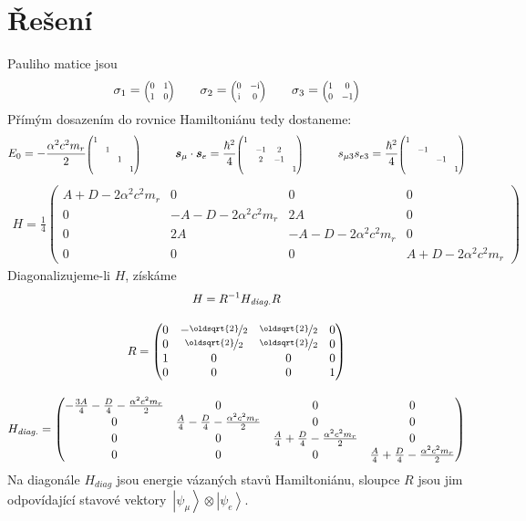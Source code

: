 \documentclass[10pt,a4paper]{article}
\newcommand{\const}[1]{\text{#1}}
\newcommand{\mat}[1]{
    \begin{pmatrix}
        #1
    \end{pmatrix}
}
\newcommand{\smat}[2][1]{
    \scalebox{#1}{$\mat{#2}$}
}
\newcommand{\ket}[1]{\left| #1 \right>}
\renewcommand{\i}{\const{i}}
\begin{document}
\section{Řešení}
Pauliho matice jsou
\begin{align*}
    \sigma_1 = \smat[0.7]{0 & 1\\1 & 0}
    \hspace{2em}
    \sigma_2 = \smat[0.7]{0 & - \i\\\i & 0}
    \hspace{2em}
    \sigma_3 = \smat[0.7]{1 & 0\\0 & -1}
\end{align*}
Přímým dosazením do rovnice Hamiltoniánu tedy dostaneme:
\begin{align*}
    E_0 =
    - \frac{\alpha^{2} c^{2} m_{r}}{2}
    \smat[0.7]{1 \\ & 1 \\ & & 1 \\ & & & 1}
    \hspace{3em}
    \bm{s}_\mu \cdot \bm{s}_e =
    \frac{\hbar^2}{4}
    \smat[0.7]{1 & & & \\ & -1 & 2 & \\ & 2 & -1 & \\ & & & 1}
    \hspace{3em}
    s_{\mu 3} s_{e 3} =
    \frac{\hbar^2}{4}
    \smat[0.7]{1 & & & \\ & -1 &  & \\ &  & -1 & \\ &  &  & 1}
\end{align*}
\begin{align*}
    H = \frac{1}{4}
    \mat{A + D - 2 \alpha^{2} c^{2} m_{r} & 0 & 0 & 0\\0 & - A - D - 2 \alpha^{2} c^{2} m_{r} & 2 A & 0\\0 & 2 A & - A - D - 2 \alpha^{2} c^{2} m_{r} & 0\\0 & 0 & 0 & A + D - 2 \alpha^{2} c^{2} m_{r}}
\end{align*}
Diagonalizujeme-li $H$, získáme
\begin{gather*}
    H = R^{-1} H_\textit{diag.} R
    \\[10pt]
    R = \mat{0 & - \nicefrac{\oldsqrt{2}}{2} & \nicefrac{\oldsqrt{2}}{2} & 0\\0 & \nicefrac{\oldsqrt{2}}{2} & \nicefrac{\oldsqrt{2}}{2} & 0\\1 & 0 & 0 & 0\\0 & 0 & 0 & 1}
    \\[10pt]
    H_\textit{diag.} = \mat{- \frac{3 A}{4} - \frac{D}{4} - \frac{\alpha^{2} c^{2} m_{r}}{2} & 0 & 0 & 0\\0 & \frac{A}{4} - \frac{D}{4} - \frac{\alpha^{2} c^{2} m_{r}}{2} & 0 & 0\\0 & 0 & \frac{A}{4} + \frac{D}{4} - \frac{\alpha^{2} c^{2} m_{r}}{2} & 0\\0 & 0 & 0 & \frac{A}{4} + \frac{D}{4} - \frac{\alpha^{2} c^{2} m_{r}}{2}}
\end{gather*}
Na diagonále $H_\textit{diag}$ jsou energie vázaných stavů Hamiltoniánu, sloupce $R$ jsou jim odpovídající stavové vektory~${\ket{\psi_\mu} \otimes \ket{\psi_e}}$.
\end{document}
